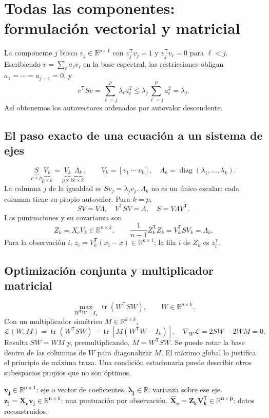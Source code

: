 \documentclass[11pt,a4paper]{article}
\newcommand{\R}{\mathbb R}
\newcommand{\T}{^{\mathsf T}}
\DeclareMathOperator{\tr}{tr}
\DeclareMathOperator{\diag}{diag}
\theoremstyle{definition}
\begin{document}
\section{Todas las componentes: formulación vectorial y matricial}
La componente $j$ busca $v_j\in\R^{p\times1}$ con $v_j\T v_j=1$ y $v_j\T v_\ell=0$ para $\ell<j$. Escribiendo $v=\sum_\ell a_\ell v_\ell$ en la base espectral, las restricciones obligan $a_1=\cdots=a_{j-1}=0$, y
\[
v\T Sv=\sum_{\ell=j}^p\lambda_\ell a_\ell^2\le\lambda_j\sum_{\ell=j}^pa_\ell^2=\lambda_j.
\]
Así obtenemos los autovectores ordenados por autovalor descendente.
\subsection{El paso exacto de una ecuación a un sistema de ejes}
\[
\underbrace{S}_{p\times p}\underbrace{V_k}_{p\times k}
=\underbrace{V_k}_{p\times k}\underbrace{\Lambda_k}_{k\times k},\qquad
V_k=[v_1\ \cdots\ v_k],\quad\Lambda_k=\diag(\lambda_1,\ldots,\lambda_k).
\]
La columna $j$ de la igualdad es $Sv_j=\lambda_jv_j$. $\Lambda_k$ no es un único escalar: cada columna tiene su propio autovalor. Para $k=p$,
\[
SV=V\Lambda,\quad V\T SV=\Lambda,\quad S=V\Lambda V\T.
\]
Las puntuaciones y su covarianza son
\[
\boxed{Z_k=X_cV_k\in\R^{n\times k}},\qquad
\frac1{n-1}Z_k\T Z_k=V_k\T SV_k=\Lambda_k.
\]
Para la observación $i$, $z_i=V_k\T(x_i-\bar x)\in\R^{k\times1}$; la fila $i$ de $Z_k$ es $z_i\T$.
\subsection{Optimización conjunta y multiplicador matricial}
\[
\max_{W\T W=I_k}\tr(W\T SW),\qquad W\in\R^{p\times k}.
\]
Con un multiplicador simétrico $M\in\R^{k\times k}$,
\[
\mathcal L(W,M)=\tr(W\T SW)-\tr[M(W\T W-I_k)],\quad
\nabla_W\mathcal L=2SW-2WM=0.
\]
Resulta $SW=WM$ y, premultiplicando, $M=W\T SW$. Se puede rotar la base dentro de las columnas de $W$ para diagonalizar $M$. El máximo global lo justifica el principio de máxima traza. Una condición estacionaria puede describir otros subespacios propios que no son óptimos.
\begin{idea}
$\boldsymbol{v_j\in\R^{p\times1}}$: eje o vector de coeficientes.\quad
$\boldsymbol{\lambda_j\in\R}$: varianza sobre ese eje.\\
$\boldsymbol{z_j=X_cv_j\in\R^{n\times1}}$: una puntuación por observación.\quad
$\boldsymbol{\widehat X_c=Z_kV_k\T\in\R^{n\times p}}$: datos reconstruidos.
\end{idea}
\end{document}
